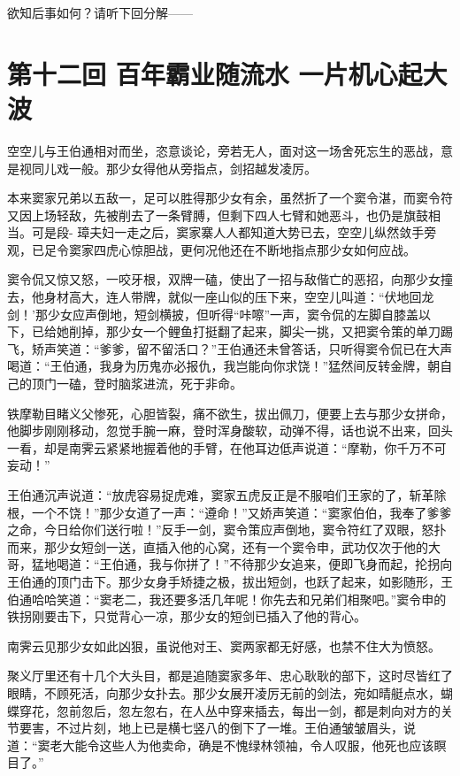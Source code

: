 \documentclass[12pt,oneside]{book}
\begin{document}
欲知后事如何？请听下回分解------

\chapter{第十二回 百年霸业随流水
一片机心起大波}\label{ux7b2cux5341ux4e8cux56de-ux767eux5e74ux9738ux4e1aux968fux6d41ux6c34-ux4e00ux7247ux673aux5fc3ux8d77ux5927ux6ce2}

空空儿与王伯通相对而坐，恣意谈论，旁若无人，面对这一场舍死忘生的恶战，意是视同儿戏一般。那少女得他从旁指点，剑招越发凌厉。

本来窦家兄弟以五敌一，足可以胜得那少女有余，虽然折了一个窦令湛，而窦令符又因上场轻敌，先被削去了一条臂膊，但剩下四人七臂和她恶斗，也仍是旗鼓相当。可是段-
璋夫妇一走之后，窦家寨人人都知道大势已去，空空儿纵然敛手旁观，已足令窦家四虎心惊胆战，更何况他还在不断地指点那少女如何应战。

窦令侃又惊又怒，一咬牙根，双牌一磕，使出了一招与敌偕亡的恶招，向那少女撞去，他身材高大，连人带牌，就似一座山似的压下来，空空儿叫道：``伏地回龙剑！'那少女应声倒地，短剑横披，但听得``咔嚓''一声，窦令侃的左脚自膝盖以下，已给她削掉，那少女一个鲤鱼打挺翻了起来，脚尖一挑，又把窦令策的单刀踢飞，矫声笑道：``爹爹，留不留活口？''王伯通还未曾答话，只听得窦令侃已在大声喝道：``王伯通，我身为历鬼亦必报仇，我岂能向你求饶！''猛然间反转金牌，朝自己的顶门一磕，登时脑浆进流，死于非命。

铁摩勒目睹义父惨死，心胆皆裂，痛不欲生，拔出佩刀，便要上去与那少女拼命，他脚步刚刚移动，忽觉手腕一麻，登时浑身酸软，动弹不得，话也说不出来，回头一看，却是南霁云紧紧地握着他的手臂，在他耳边低声说道：``摩勒，你千万不可妄动！''

王伯通沉声说道：``放虎容易捉虎难，窦家五虎反正是不服咱们王家的了，斩革除根，一个不饶！''那少女道了一声：``遵命！''又娇声笑道：``窦家伯伯，我奉了爹爹之命，今日给你们送行啦！''反手一剑，窦令策应声倒地，窦令符红了双眼，怒扑而来，那少女短剑一送，直插入他的心窝，还有一个窦令申，武功仅次于他的大哥，猛地喝道：``王伯通，我与你拼了！''不待那少女追来，便即飞身而起，抡拐向王伯通的顶门击下。那少女身手矫捷之极，拔出短剑，也跃了起来，如影随形，王伯通哈哈笑道：``窦老二，我还要多活几年呢！你先去和兄弟们相聚吧。''窦令申的铁拐刚要击下，只觉背心一凉，那少女的短剑已插入了他的背心。

南霁云见那少女如此凶狠，虽说他对王、窦两家都无好感，也禁不住大为愤怒。

聚义厅里还有十几个大头目，都是追随窦家多年、忠心耿耿的部下，这时尽皆红了眼睛，不顾死活，向那少女扑去。那少女展开凌厉无前的剑法，宛如晴艇点水，蝴蝶穿花，忽前忽后，忽左忽右，在人丛中穿来插去，每出一剑，都是刺向对方的关节要害，不过片刻，地上已是横七竖八的倒下了一堆。王伯通皱皱眉头，说道：``窦老大能令这些人为他卖命，确是不愧绿林领袖，令人叹服，他死也应该瞑目了。''
\end{document}

